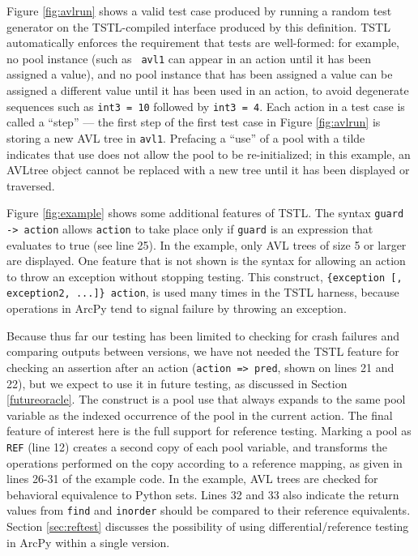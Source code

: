 Figure \ref{fig:avlrun} shows a valid test case produced by
running a random test generator on the TSTL-compiled interface
produced by this definition.  TSTL automatically enforces the requirement that
tests are well-formed: for example, no pool instance (such as {\tt
  avl1} can appear in an action until it has been assigned a value),
and no pool instance that has been assigned a value can be assigned a
different value until it has been used in an action, to avoid
degenerate sequences such as {\tt int3 = 10} followed by {\tt int3 =
  4}.  Each action in a test case is called a ``step'' --- the first
step of the first test case in Figure \ref{fig:avlrun} is storing a
new AVL tree in {\tt avl1}.  Prefacing a ``use'' of a pool with a
tilde {\tt ~} indicates that use does not allow the pool to be
re-initialized; in this example, an AVLtree object cannot be replaced
with a new tree until it has been displayed or traversed.

Figure \ref{fig:example} shows some additional features
of TSTL.  The syntax {\tt guard -> action} allows {\tt action} to take
place only if {\tt guard} is an expression that evaluates to true (see
line 25).  In the example, only AVL trees of size 5 or larger are
displayed.  One feature that is not shown is the syntax for allowing
an action to throw an exception without stopping testing. This
construct, {\tt \{exception [, exception2, ...]\} action}, is used
many times in the TSTL harness, because operations in ArcPy tend to
signal failure by throwing an exception.

Because thus far our testing
has been limited to checking for crash failures and comparing outputs
between versions, we have not needed the TSTL feature for checking an
assertion after an action ({\tt action => pred}, shown on lines 21 and
22), but we expect to use it in future testing, as discussed in Section
\ref{futureoracle}.  The construct {\tt <avl,1>} is a pool use that
always expands to the same pool variable as the indexed occurrence of
the pool in the current action.  The final feature of interest here is the full
support for reference testing.  Marking a pool as {\tt REF} (line 12) creates a
second copy of each pool variable, and transforms the operations
performed on the copy according to a reference mapping, as given in
lines 26-31 of the example code.  In the example, AVL trees are
checked for behavioral equivalence to Python sets.  Lines 32 and 33
also indicate the return values from {\tt find} and {\tt inorder}
should be compared to their reference equivalents.  Section
\ref{sec:reftest} discusses the possibility of using
differential/reference testing \cite{Differential,ICSEDiff} in ArcPy
within a single version.